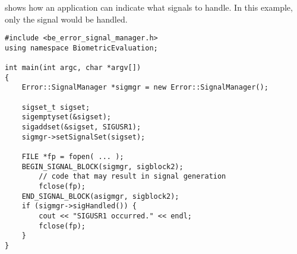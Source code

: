  shows how an application can indicate what
signals to handle. In this example, only the  signal would
be handled.

\begin{lstlisting}[caption={Specifying Signals to the \class{SignalManger}}, label=signalmanageruse2]
#include <be_error_signal_manager.h>
using namespace BiometricEvaluation;

int main(int argc, char *argv[])
{
    Error::SignalManager *sigmgr = new Error::SignalManager();

    sigset_t sigset;
    sigemptyset(&sigset);
    sigaddset(&sigset, SIGUSR1);
    sigmgr->setSignalSet(sigset);

    FILE *fp = fopen( ... );
    BEGIN_SIGNAL_BLOCK(sigmgr, sigblock2);
        // code that may result in signal generation
        fclose(fp);
    END_SIGNAL_BLOCK(asigmgr, sigblock2);
    if (sigmgr->sigHandled()) {
        cout << "SIGUSR1 occurred." << endl;
        fclose(fp);
    }
}
\end{lstlisting}
